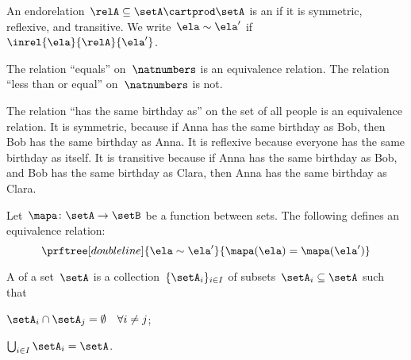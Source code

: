 \devel{ }%

\begin{definition}
    \label{def:equivalence-relation}
    An endorelation~$\relA\subseteq \setA\cartprod \setA$ is an \emph{} if it is symmetric, reflexive, and transitive.
    We write~$\ela\sim \ela'$ if~$\inrel{\ela}{\relA}{\ela'}$.
\end{definition}

\begin{example}
    The relation ``equals'' on~$\natnumbers$ is an equivalence relation.
    The relation ``less than or equal'' on~$\natnumbers$ is not.
\end{example}

\begin{example}
    The relation ``has the same birthday as'' on the set of all people is an equivalence relation.
    It is symmetric, because if Anna has the same birthday as Bob, then Bob has the same birthday as Anna.
    It is reflexive because everyone has the same birthday as itself.
    It is transitive because if Anna has the same birthday as Bob, and Bob has the same birthday as Clara, then Anna has the same birthday as Clara.
\end{example}

\begin{example}
    Let~$\mapa\colon \setA\to \setB$ be a function between sets.
    The following defines an equivalence relation:
    \begin{equation*}
        \prftree[double line]{\ela\sim \ela'}{\mapa(\ela)=\mapa(\ela')}
    \end{equation*}
\end{example}

\begin{definition}[Partition]
    \label{def:partition}
    A \emph{} of a set~$\setA$ is a collection~$\{\setA_i\}_{i\in I}$ of subsets~$\setA_i\subseteq \setA$ such that
    \begin{compactenum}
        \item $\setA_i\cap \setA_j=\emptyset \quad \forall i\neq j$;
        \item $\bigcup_{i\in I}\setA_i=\setA$.
    \end{compactenum}
\end{definition}

